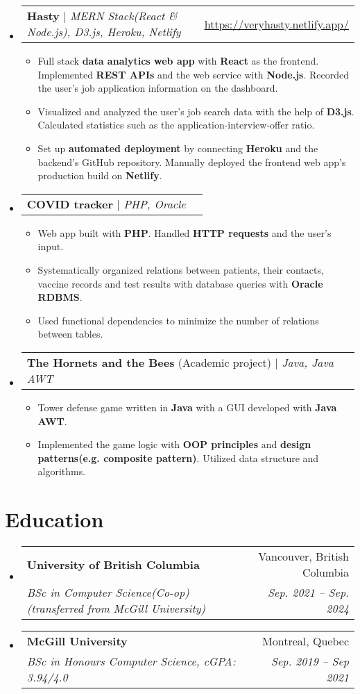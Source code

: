 \documentclass[letterpaper,11pt]{article}
\makeatletter
\newcommand{\resumeItem}[1]{
  \item\small{
    {#1 \vspace{-4pt}}
  }
}
\newcommand{\resumeSubheading}[4]{
  \vspace{-2pt}\item
    \begin{tabular*}{0.97\textwidth}[t]{l@{\extracolsep{\fill}}r}
      \textbf{#1} & #2 \\
      \textit{\small#3} & \textit{\small #4} \\
    \end{tabular*}\vspace{-7pt}
}
\newcommand{\resumeProjectHeading}[2]{
    \item
    \begin{tabular*}{0.97\textwidth}{l@{\extracolsep{\fill}}r}
      \small#1 & #2 \\
    \end{tabular*}\vspace{-7pt}
}
\newcommand{\resumeSubHeadingListStart}{\begin{itemize}[leftmargin=0.15in, label={}]}
\newcommand{\resumeSubHeadingListEnd}{\end{itemize}}
\newcommand{\resumeItemListStart}{\begin{itemize}}
\newcommand{\resumeItemListEnd}{\end{itemize}\vspace{-5pt}}
\makeatother
\begin{document}
    \resumeSubHeadingListStart
      \resumeProjectHeading
          {\textbf{Hasty} $|$ \emph{MERN Stack(React \& Node.js), D3.js, Heroku, Netlify} }{\href{https://veryhasty.netlify.app/}{\underline{https://veryhasty.netlify.app/}}
}
          \resumeItemListStart
            \resumeItem{Full stack \textbf{data analytics web app} with \textbf{React} as the frontend. Implemented \textbf{REST APIs} and the web service with \textbf{Node.js}. Recorded the user's job application information on the dashboard.}
            \resumeItem{Visualized and analyzed the user's job search data with the help of \textbf{D3.js}. Calculated statistics such as the application-interview-offer ratio.}
            \resumeItem{Set up \textbf{automated deployment} by connecting \textbf{Heroku} and the backend's GitHub repository. Manually deployed the frontend web app's production build on \textbf{Netlify}.}
          \resumeItemListEnd
      \resumeProjectHeading
          {\textbf{COVID tracker} $|$ \emph{PHP, Oracle} }{}
          \resumeItemListStart
            \resumeItem{Web app built with \textbf{PHP}. Handled \textbf{HTTP requests} and the user's input.}
            \resumeItem{Systematically organized relations between patients, their contacts, vaccine records and test results with database queries with \textbf{Oracle RDBMS}.}
            \resumeItem{Used functional dependencies to minimize the number of relations between tables.}
        
          \resumeItemListEnd
      \resumeProjectHeading
          {\textbf{The Hornets and the Bees }{(Academic project)} $|$ \emph{Java, Java AWT}}{}
          \resumeItemListStart
            \resumeItem{Tower defense game written in \textbf{Java} with a GUI developed with \textbf{Java AWT}.}
            \resumeItem{Implemented the game logic with \textbf{OOP principles} and \textbf{design patterns(e.g. composite pattern)}. Utilized data structure and algorithms.}
          \resumeItemListEnd
          
    \resumeSubHeadingListEnd
\section{Education}
  \resumeSubHeadingListStart
    \resumeSubheading
      {University of British Columbia}{Vancouver, British Columbia}
      {BSc in Computer Science(Co-op) (transferred from McGill University)}{Sep. 2021 -- Sep. 2024}
    \resumeSubheading
      {McGill University}{Montreal, Quebec}
      {BSc in Honours Computer Science, cGPA: 3.94/4.0}{Sep. 2019 -- Sep 2021 }
  \resumeSubHeadingListEnd
\end{document}
